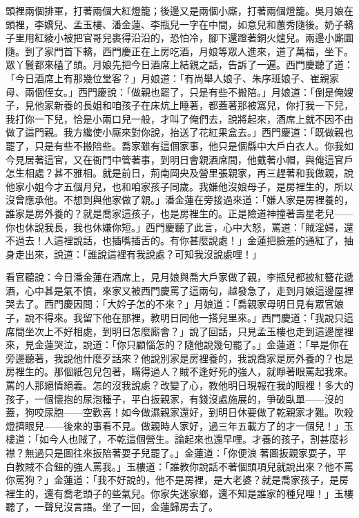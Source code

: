 頭裡兩個排軍，打著兩個大紅燈籠；後邊又是兩個小廝，打著兩個燈籠。吳月娘在頭裡，李嬌兒、孟玉樓、潘金蓮、李瓶兒一字在中間，如意兒和蕙秀隨後。奶子轎子里用紅綾小被把官哥兒裹得沿沿的，恐怕冷，腳下還蹬著銅火爐兒。兩邊小廝圜隨。到了家門首下轎，西門慶正在上房吃酒，月娘等眾人進來，道了萬福，坐下。眾丫鬟都來磕了頭。月娘先把今日酒席上結親之話，告訴了一遍。西門慶聽了道：「今日酒席上有那幾位堂客？」月娘道：「有尚舉人娘子、朱序班娘子、崔親家母、兩個侄女。」西門慶說：「做親也罷了，只是有些不搬陪。」月娘道：「倒是俺嫂子，見他家新養的長姐和咱孩子在床炕上睡著，都蓋著那被窩兒，你打我一下兒，我打你一下兒，恰是小兩口兒一般，才叫了俺們去，說將起來，酒席上就不因不由做了這門親。我方纔使小廝來對你說，抬送了花紅果盒去。」西門慶道：「既做親也罷了，只是有些不搬陪些。喬家雖有這個家事，他只是個縣中大戶白衣人。你我如今見居著這官，又在衙門中管著事，到明日會親酒席間，他戴著小帽，與俺這官戶怎生相處？甚不雅相。就是前日，荊南岡央及營里張親家，再三趕著和我做親，說他家小姐今才五個月兒，也和咱家孩子同歲。我嫌他沒娘母子，是房裡生的，所以沒曾應承他。不想到與他家做了親。」潘金蓮在旁接過來道：「嫌人家是房裡養的，誰家是房外養的？就是喬家這孩子，也是房裡生的。正是險道神撞著壽星老兒——你也休說我長，我也休嫌你短。」西門慶聽了此言，心中大怒，罵道：「賊淫婦，還不過去！人這裡說話，也插嘴插舌的。有你甚麼說處！」金蓮把臉羞的通紅了，抽身走出來，說道：「誰說這裡有我說處？可知我沒說處哩！」

看官聽說：今日潘金蓮在酒席上，見月娘與喬大戶家做了親，李瓶兒都披紅簪花遞酒，心中甚是氣不憤，來家又被西門慶罵了這兩句，越發急了，走到月娘這邊屋裡哭去了。西門慶因問：「大妗子怎的不來？」月娘道：「喬親家母明日見有眾官娘子，說不得來。我留下他在那裡，教明日同他一搭兒里來。」西門慶道：「我說只這席間坐次上不好相處，到明日怎麼廝會？」說了回話，只見孟玉樓也走到這邊屋裡來，見金蓮哭泣，說道：「你只顧惱怎的？隨他說幾句罷了。」金蓮道：「早是你在旁邊聽著，我說他什麼歹話來？他說別家是房裡養的，我說喬家是房外養的？也是房裡生的。那個紙包兒包著，瞞得過人？賊不逢好死的強人，就睜著眼罵起我來。罵的人那絕情絕義。怎的沒我說處？改變了心，教他明日現報在我的眼裡！多大的孩子，一個懷抱的尿泡種子，平白扳親家，有錢沒處施展的，爭破臥單——沒的蓋，狗咬尿胞——空歡喜！如今做濕親家還好，到明日休要做了乾親家才難。吹殺燈擠眼兒——後來的事看不見。做親時人家好，過三年五載方了的才一個兒！」玉樓道：「如今人也賊了，不乾這個營生。論起來也還早哩。才養的孩子，割甚麼衫襟？無過只是圖往來扳陪著耍子兒罷了。」金蓮道：「你便浪𢵞著圖扳親家耍子，平白教賊不合鈕的強人罵我。」玉樓道：「誰教你說話不著個頭項兒就說出來？他不罵你罵狗？」金蓮道：「我不好說的，他不是房裡，是大老婆？就是喬家孩子，是房裡生的，還有喬老頭子的些氣兒。你家失迷家鄉，還不知是誰家的種兒哩！」玉樓聽了，一聲兒沒言語。坐了一回，金蓮歸房去了。

